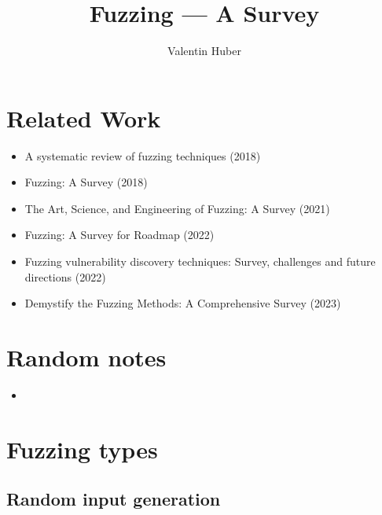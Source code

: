\documentclass[12pt]{article}
\title{Fuzzing — A Survey}
\author{Valentin Huber}
\begin{document}


\maketitle
\tableofcontents

\section{Related Work}
\begin{itemize}
    \item A systematic review of fuzzing techniques (2018)\cite{Science}
    \item Fuzzing: A Survey (2018)\cite{FuzzingASurvey}
    \item The Art, Science, and Engineering of Fuzzing: A Survey (2021)\cite{ArtScienceEngineeringFuzzing}
    \item Fuzzing: A Survey for Roadmap (2022)\cite{FuzzingASurveyforRoadmap}
    \item Fuzzing vulnerability discovery techniques: Survey, challenges and future directions (2022)\cite{FuzzingVulnerabilityDiscoveryTechniques}
    \item Demystify the Fuzzing Methods: A Comprehensive Survey (2023)\cite{Demystifying}
\end{itemize}


\section{Random notes}
\begin{itemize}
    \item {}\cite{DART}
\end{itemize}

\section{Fuzzing types}
\subsection{Random input generation}
\end{document}
